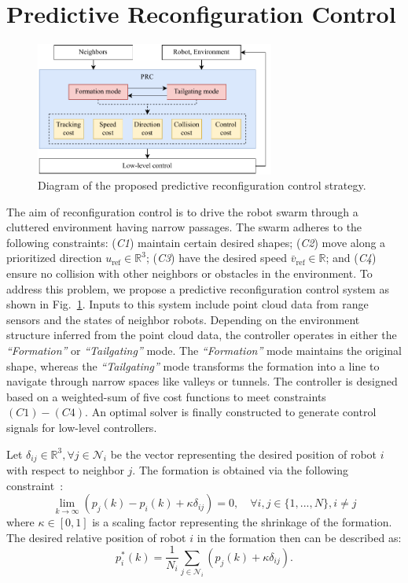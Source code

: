 \section{Predictive Reconfiguration Control}\label{sec:propose}

\begin{figure}
    \centering
    \includegraphics[width=0.7\textwidth]{paper3/images/diagram.pdf}
    \caption{Diagram of the proposed predictive reconfiguration control strategy.}
    \label{fig:diagram}
\end{figure}

The aim of reconfiguration control is to drive the robot swarm through a cluttered environment having narrow passages. The swarm adheres to the following constraints: (\textit{C1}) maintain certain desired shapes; (\textit{C2}) move along a prioritized direction $u_\text{ref}\in\mathbb{R}^{3}$; (\textit{C3}) have the desired speed $\bar{v}_\text{ref}\in\mathbb{R}$; and (\textit{C4}) ensure no collision with other neighbors or obstacles in the environment. To address this problem, we propose a predictive reconfiguration control system as shown in Fig.~\ref{fig:diagram}. Inputs to this system include point cloud data from range sensors and the states of neighbor robots. Depending on the environment structure inferred from the point cloud data, the controller operates in either the \textit{``Formation''} or \textit{``Tailgating''} mode. The \textit{``Formation''} mode maintains the original shape, whereas the \textit{``Tailgating''} mode transforms the formation into a line to navigate through narrow spaces like valleys or tunnels. The controller is designed based on a weighted-sum of five cost functions to meet constraints $(C1)-(C4)$. An optimal solver is finally constructed to generate control signals for low-level controllers.

Let $\delta_{ij}\in\mathbb{R}^3,\forall j\in \mathcal{N}_i$ be the vector representing the desired position of robot $i$ with respect to neighbor $j$. The formation is obtained via the following constraint~\cite{Dong2016,6798711}:
\begin{equation}
    \lim_{k\to\infty}{\left(p_j(k)-p_i(k)+\kappa\delta_{ij}\right)}=0,\quad\forall i,j\in\{1,...,N\}, i\neq j
\end{equation}
where $\kappa\in[0,1]$ is a scaling factor representing the shrinkage of the formation. The desired relative position of robot $i$ in the formation then can be described as:
\begin{equation}
    p^*_i(k)=\dfrac{1}{N_i}\sum_{j\in\mathcal{N}_i}{\left(p_j\left(k\right)+\kappa\delta_{ij}\right)}.
    \label{eqn:formation}
\end{equation}

